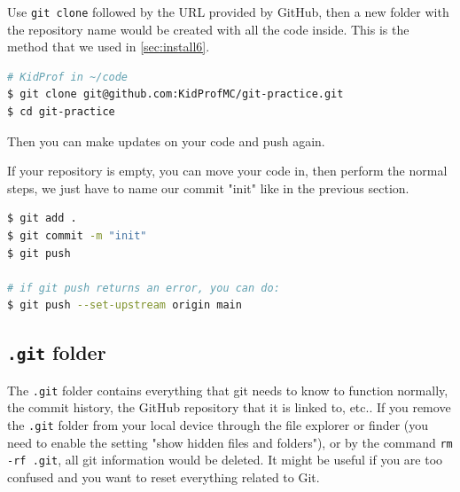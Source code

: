 Use \texttt{git clone} followed by the URL provided by GitHub, then a new folder with the repository name would be created with all the code inside. This is the method that we used in \cref{sec:install6}.

\begin{lstlisting}[language=bash]
# KidProf in ~/code
$ git clone git@github.com:KidProfMC/git-practice.git
$ cd git-practice
\end{lstlisting}

Then you can make updates on your code and push again.

If your repository is empty, you can move your code in, then perform the normal steps, we just have to name our commit "init" like in the previous section.

\begin{lstlisting}[language=bash]
$ git add .
$ git commit -m "init"
$ git push

# if git push returns an error, you can do:
$ git push --set-upstream origin main
\end{lstlisting}

\subsection{\texttt{.git} folder}

The \texttt{.git} folder contains everything that git needs to know to function normally, the commit history, the GitHub repository that it is linked to, etc.. If you remove the \texttt{.git} folder from your local device through the file explorer or finder (you need to enable the setting "show hidden files and folders"), or by the command \texttt{rm -rf .git}, all git information would be deleted. It might be useful if you are too confused and you want to reset everything related to Git.

